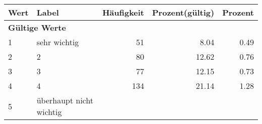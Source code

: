      \begin{longtable}{lXrrr}
     \toprule
     \textbf{Wert} & \textbf{Label} & \textbf{Häufigkeit} & \textbf{Prozent(gültig)} & \textbf{Prozent} \\
     \endhead
     \midrule
     \multicolumn{5}{l}{\textbf{Gültige Werte}}\\

     1 &
     \multicolumn{1}{X}{ sehr wichtig   } &


       \num{51} &
       \num[round-mode=places,round-precision=2]{8,04} &
         \num[round-mode=places,round-precision=2]{0,49} \\

     2 &
     \multicolumn{1}{X}{ 2   } &


       \num{80} &
       \num[round-mode=places,round-precision=2]{12,62} &
         \num[round-mode=places,round-precision=2]{0,76} \\

     3 &
     \multicolumn{1}{X}{ 3   } &


       \num{77} &
       \num[round-mode=places,round-precision=2]{12,15} &
         \num[round-mode=places,round-precision=2]{0,73} \\

     4 &
     \multicolumn{1}{X}{ 4   } &


       \num{134} &
       \num[round-mode=places,round-precision=2]{21,14} &
         \num[round-mode=places,round-precision=2]{1,28} \\

     5 &
     \multicolumn{1}{X}{ überhaupt nicht wichtig   } &



\end{longtable}
